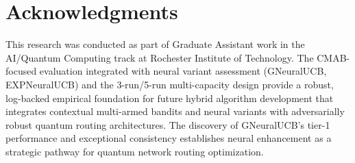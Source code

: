 \documentclass[12pt,a4paper]{article}
\begin{document}
\section{Acknowledgments}

This research was conducted as part of Graduate Assistant work in the AI/Quantum Computing track at Rochester Institute of Technology. The CMAB-focused evaluation integrated with neural variant assessment (GNeuralUCB, EXPNeuralUCB) and the 3-run/5-run multi-capacity design provide a robust, log-backed empirical foundation for future hybrid algorithm development that integrates contextual multi-armed bandits and neural variants with adversarially robust quantum routing architectures. The discovery of GNeuralUCB's tier-1 performance and exceptional consistency establishes neural enhancement as a strategic pathway for quantum network routing optimization.
\end{document}
